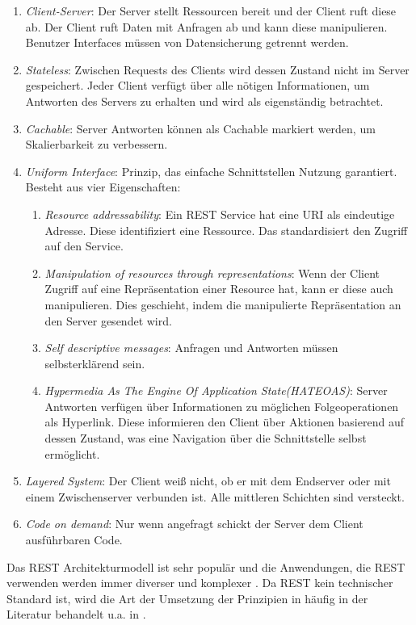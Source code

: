 \begin{enumerate}
  \item \textit{Client-Server}: Der Server stellt Ressourcen bereit und der Client ruft diese ab. Der Client ruft Daten mit Anfragen ab und kann diese manipulieren. Benutzer Interfaces müssen von Datensicherung getrennt werden.
  \item \textit{Stateless}: Zwischen Requests des Clients wird dessen Zustand nicht im Server gespeichert. Jeder Client verfügt über alle nötigen Informationen, um Antworten des Servers zu erhalten und wird als eigenständig betrachtet. 
  \item \textit{Cachable}: Server Antworten können als Cachable markiert werden, um Skalierbarkeit zu verbessern.
  \item \textit{Uniform Interface}: Prinzip, das einfache Schnittstellen Nutzung garantiert. Besteht aus vier Eigenschaften:
  \begin{enumerate}
    \item \textit{Resource addressability}: Ein REST Service hat eine URI als eindeutige Adresse. Diese identifiziert eine Ressource. Das standardisiert den Zugriff auf den Service.
    \item \textit{Manipulation of resources through representations}: Wenn der Client Zugriff auf eine Repräsentation einer Resource hat, kann er diese auch manipulieren. Dies geschieht, indem die manipulierte Repräsentation an den Server gesendet wird.
    \item \textit{Self descriptive messages}: Anfragen und Antworten müssen selbsterklärend sein.
    \item \textit{Hypermedia As The Engine Of Application State(HATEOAS)}: Server Antworten verfügen über Informationen zu möglichen Folgeoperationen als Hyperlink. Diese informieren den Client über Aktionen basierend auf dessen Zustand, was eine Navigation über die Schnittstelle selbst ermöglicht.
  \end{enumerate}
  \item \textit{Layered System}: Der Client weiß nicht, ob er mit dem Endserver oder mit einem Zwischenserver verbunden ist. Alle mittleren Schichten sind versteckt.
  \item \textit{Code on demand}: Nur wenn angefragt schickt der Server dem Client ausführbaren Code.
\end{enumerate}
Das REST Architekturmodell ist sehr populär und die Anwendungen, die REST verwenden werden immer diverser und komplexer \parencite{kotstein_which_2021}. Da REST kein technischer Standard ist, wird die Art der Umsetzung der Prinzipien in häufig in der Literatur behandelt u.a. in \parencite{richardson_restful_2007}\parencite{masse_rest_2011}\parencite{webber_rest_2010}\parencite{renzel_todays_2012}.


